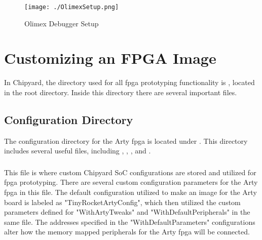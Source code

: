 \begin{figure}[h!tbp]
  \centering
  \texttt{[image: ./OlimexSetup.png]}
  \caption{Olimex Debugger Setup~\cite[p.~5]{FreedomDevGuide}}
  \label{fig:olimexsetup}
\end{figure}

\section{Customizing an FPGA Image}\label{sec:Customizing}
In Chipyard, the directory used for all \Gls{fpga} prototyping functionality is , located in the root directory.
Inside this directory there are several important files.


\subsection{Configuration Directory}\label{sec:Customizing_FPGA-Config_Directory}
The configuration directory for the Arty \Gls{fpga} is located under .
This directory includes several useful files, including , , , and .

\subsubsection{}\label{sec:Customizing_FPGA-Configs.scala}
This file is where custom Chipyard SoC configurations are stored and utilized for \Gls{fpga} prototyping.
There are several custom configuration parameters for the Arty \Gls{fpga} in this file.
The default configuration utilized to make an image for the Arty board is labeled as "TinyRocketArtyConfig", which then utilized the custom parameters defined for "WithArtyTweaks" and "WithDefaultPeripherals" in the same file.
The addresses specified in the "WithDefaultParameters" configurations alter how the memory mapped peripherals for the Arty \Gls{fpga} will be connected.

